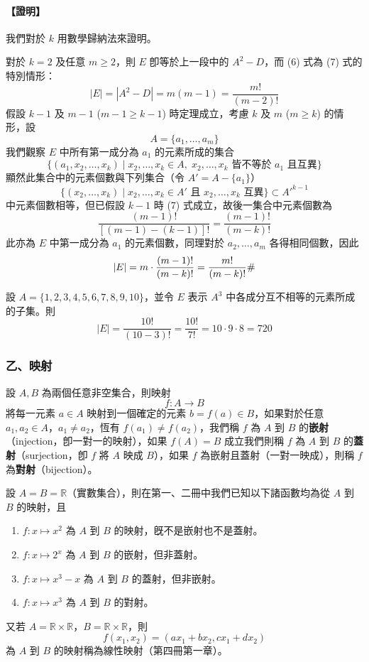 \paragraph{【證明】}
我們對於 $k$ 用數學歸納法來證明。

對於 $k = 2$ 及任意 $m \ge 2$，則 $E$ 卽等於上一段中的 $A^2 - D$，而 (6) 式為 (7) 式的特別情形：
\[
|E| = |A^2 - D| = m(m-1) = \frac{m!}{(m-2)!}
\]
假設 $k-1$ 及 $m-1$ ($m-1 \ge k-1$) 時定理成立，考慮 $k$ 及 $m$ ($m \ge k$) 的情形，設
\[
A = \{a_1, \ldots, a_m\}
\]
我們觀察 $E$ 中所有第一成分為 $a_1$ 的元素所成的集合
\[
\{(a_1, x_2, \ldots, x_k) \mid x_2, \ldots, x_k \in A,\; x_2, \ldots, x_k \text{ 皆不等於 } a_1 \text{ 且互異}\}
\]
顯然此集合中的元素個數與下列集合（令 $A' = A - \{a_1\}$）
\[
\{(x_2, \ldots, x_k) \mid x_2, \ldots, x_k \in A' \text{ 且 } x_2, \ldots, x_k \text{ 互異}\} \subset A'^{k-1}
\]
中元素個數相等，但已假設 $k-1$ 時 (7) 式成立，故後一集合中元素個數為
\[
\frac{(m-1)!}{[(m-1)-(k-1)]!} = \frac{(m-1)!}{(m-k)!}
\]
此亦為 $E$ 中第一成分為 $a_1$ 的元素個數，同理對於 $a_2, \ldots, a_m$ 各得相同個數，因此
\[
|E| = m \cdot \frac{(m-1)!}{(m-k)!} = \frac{m!}{(m-k)!} \hfill \#
\]

\medskip
\begin{example}\label{ex:b5-2-3}
設 $A=\{1,2,3,4,5,6,7,8,9,10\}$，並令 $E$ 表示 $A^3$ 中各成分互不相等的元素所成的子集。則
\[
|E| = \frac{10!}{(10-3)!} = \frac{10!}{7!} = 10 \cdot 9 \cdot 8 = 720
\]
\end{example}

\subsubsection*{乙、映射}

設 $A, B$ 為兩個任意非空集合，則映射
\[
f : A \longrightarrow B
\]
將每一元素 $a \in A$ 映射到一個確定的元素 $b = f(a) \in B$，如果對於任意 $a_1, a_2 \in A$，$a_1 \ne a_2$，恆有 $f(a_1) \ne f(a_2)$，我們稱 $f$ 為 $A$ 到 $B$ 的\textbf{嵌射}（injection，卽一對一的映射），如果 $f(A) = B$ 成立我們則稱 $f$ 為 $A$ 到 $B$ 的\textbf{蓋射}（surjection，卽 $f$ 將 $A$ 映成 $B$），如果 $f$ 為嵌射且蓋射（一對一映成），則稱 $f$ 為\textbf{對射}（bijection）。

設 $A = B = \mathbb{R}$（實數集合），則在第一、二冊中我們已知以下諸函數均為從 $A$ 到 $B$ 的映射，且
\begin{enumerate}[label=(\roman*), topsep=2pt, itemsep=2pt]
  \item $f : x \longmapsto x^2$ 為 $A$ 到 $B$ 的映射，旣不是嵌射也不是蓋射。
  \item $f : x \longmapsto 2^x$ 為 $A$ 到 $B$ 的嵌射，但非蓋射。
  \item $f : x \longmapsto x^3 - x$ 為 $A$ 到 $B$ 的蓋射，但非嵌射。
  \item $f : x \longmapsto x^3$ 為 $A$ 到 $B$ 的對射。
\end{enumerate}
又若 $A = \mathbb{R} \times \mathbb{R}$，\quad $B = \mathbb{R} \times \mathbb{R}$，則
\[
f(x_1, x_2) = (a x_1 + b x_2, c x_1 + d x_2)
\]
為 $A$ 到 $B$ 的映射稱為線性映射（第四冊第一章）。

